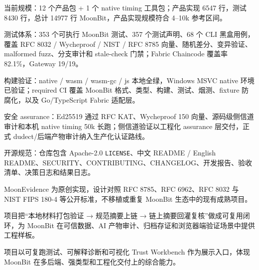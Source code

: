 \documentclass[10pt,a4paper]{article}
\newcommand{\docline}[1]{{\color{ink}#1\par}}
\newcommand{\sect}[1]{\vspace{3pt}{\normalsize\bfseries\color{ink}#1}\par\vspace{1pt}}
\begin{document}
\sect{工程质量与交付状态}

\docline{当前规模：12 个产品包 + 1 个 native timing 工具包；产品实现 6547 行，测试 8430 行，总计 14977 行 MoonBit，产品实现规模符合 4--10k 参考区间。}
\docline{测试体系：353 个可执行 MoonBit 测试、357 个测试声明、68 个 CLI 黑盒用例，覆盖 RFC 8032 / Wycheproof / NIST / RFC 8785 向量、随机差分、变异验证、malformed fuzz、分支审计和 stale-check 门禁；Fabric Chaincode 覆盖率 82.1\%，Gateway 19/19。}
\docline{构建验证：native / wasm / wasm-gc / js 本地全绿，Windows MSVC native 环境已验证；required CI 覆盖 MoonBit 格式、类型、构建、测试、烟测、fixture 防腐化，以及 Go/TypeScript Fabric 适配层。}
\docline{安全 assurance：Ed25519 通过 RFC KAT、Wycheproof 150 向量、源码级侧信道审计和本机 native timing 50k 长跑；侧信道验证以工程化 assurance 层交付，正式 dudect/后端产物审计纳入生产化认证路线。}
\docline{开源规范：仓库包含 Apache-2.0 \texttt{LICENSE}、中文 README / English README、SECURITY、CONTRIBUTING、CHANGELOG、开发报告、验收清单、决策日志和结果日志。}

\sect{原创与生态价值}

\docline{MoonEvidence 为原创实现，设计对照 RFC 8785、RFC 6962、RFC 8032 与 NIST FIPS 180-4 等公开标准，不移植或重复 MoonBit 生态中的现有成熟项目。}
\docline{项目把“本地材料打包验证 → 规范摘要上链 → 链上摘要回灌复核”做成可复用闭环，为 MoonBit 在可信数据、AI 产物审计、归档存证和浏览器端验证场景中提供工程样板。}
\docline{项目以可复跑测试、可解释诊断和可视化 Trust Workbench 作为展示入口，体现 MoonBit 在多后端、强类型和工程化交付上的综合能力。}
\end{document}
